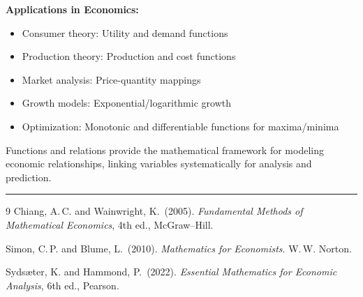 \begin{tcolorbox}[sectionbox]
\textbf{Applications in Economics:}
\begin{itemize}
    \item Consumer theory: Utility and demand functions
    \item Production theory: Production and cost functions
    \item Market analysis: Price-quantity mappings
    \item Growth models: Exponential/logarithmic growth
    \item Optimization: Monotonic and differentiable functions for maxima/minima
\end{itemize}
\end{tcolorbox}

\begin{tcolorbox}[sectionbox]
Functions and relations provide the mathematical framework for modeling economic relationships, linking variables systematically for analysis and prediction.
\end{tcolorbox}



\bigskip
\hrule
\bigskip


\bigskip

\begin{thebibliography}{9}
Chiang, A.\,C. and Wainwright, K.\ (2005). \emph{Fundamental Methods of Mathematical Economics}, 4th ed., McGraw--Hill.

Simon, C.\,P. and Blume, L.\ (2010). \emph{Mathematics for Economists}. W.\,W. Norton.

Syds\ae ter, K. and Hammond, P.\ (2022). \emph{Essential Mathematics for Economic Analysis}, 6th ed., Pearson.
\end{thebibliography}





